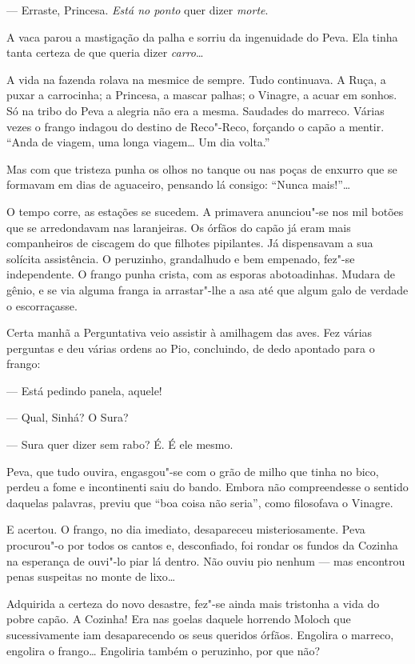 --- Erraste, Princesa. \emph{Está no ponto} quer dizer \emph{morte}.

A vaca parou a mastigação da palha e sorriu da ingenuidade do Peva. Ela
tinha tanta certeza de que queria dizer \emph{carro}\ldots{}

A vida na fazenda rolava na mesmice de sempre. Tudo continuava. A Ruça,
a puxar a carrocinha; a Princesa, a mascar palhas; o Vinagre, a acuar em
sonhos. Só na tribo do Peva a alegria não era a mesma. Saudades do
marreco. Várias vezes o frango indagou do destino de Reco"-Reco, forçando
o capão a mentir. ``Anda de viagem, uma longa viagem\ldots{} Um dia volta.''

Mas com que tristeza punha os olhos no tanque ou nas poças de enxurro
que se formavam em dias de aguaceiro, pensando lá consigo: ``Nunca
mais!''\ldots{}

O tempo corre, as estações se sucedem. A primavera anunciou"-se nos mil
botões que se arredondavam nas laranjeiras. Os órfãos do capão já eram
mais companheiros de ciscagem do que filhotes pipilantes. Já dispensavam
a sua solícita assistência. O peruzinho, grandalhudo e bem empenado,
fez"-se independente. O frango punha crista, com as esporas abotoadinhas.
Mudara de gênio, e se via alguma franga ia arrastar"-lhe a asa até que
algum galo de verdade o escorraçasse.

Certa manhã a Perguntativa veio assistir à amilhagem das aves. Fez
várias perguntas e deu várias ordens ao Pio, concluindo, de dedo
apontado para o frango:

--- Está pedindo panela, aquele!

--- Qual, Sinhá? O Sura?

--- Sura quer dizer sem rabo? É. É ele mesmo.

Peva, que tudo ouvira, engasgou"-se com o grão de milho que tinha no
bico, perdeu a fome e incontinenti saiu do bando. Embora não
compreendesse o sentido daquelas palavras, previu que ``boa coisa não
seria'', como filosofava o Vinagre.

E acertou. O frango, no dia imediato, desapareceu misteriosamente. Peva
procurou"-o por todos os cantos e, desconfiado, foi rondar os fundos da
Cozinha na esperança de ouvi"-lo piar lá dentro. Não ouviu pio nenhum ---
mas encontrou penas suspeitas no monte de lixo\ldots{}

Adquirida a certeza do novo desastre, fez"-se ainda mais tristonha a vida
do pobre capão. A Cozinha! Era nas goelas daquele horrendo Moloch que
sucessivamente iam desaparecendo os seus queridos órfãos. Engolira o
marreco, engolira o frango\ldots{} Engoliria também o peruzinho, por que não?

